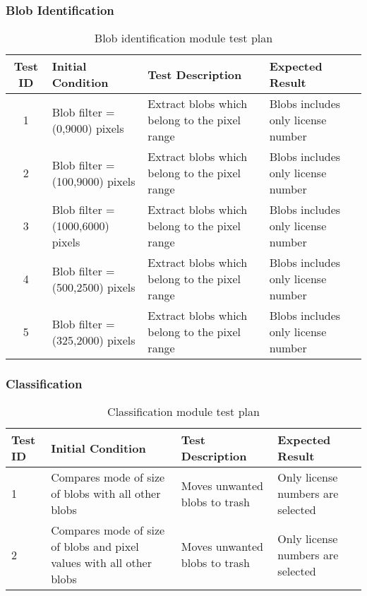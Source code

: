 \documentclass[a4paper,10pt]{iesreport}
\begin{document}
\subsubsection*{Blob Identification}
\begin{table}
\caption{Blob identification module test plan}
\begin{tabular}{c|p{3.2cm}|p{5cm}|p{3.5cm}}
\hline
\textbf{Test ID} & \textbf{Initial Condition} & \textbf{Test Description} & \textbf{Expected Result} \\ [0.3ex]
\hline
1 & Blob filter = (0,9000) pixels & Extract blobs which belong to the pixel range & Blobs includes only license number\\
\hline
2 & Blob filter = (100,9000) pixels & Extract blobs which belong to the pixel range & Blobs includes only license number\\
\hline
3 & Blob filter = (1000,6000) pixels & Extract blobs which belong to the pixel range & Blobs includes only license number\\
\hline
4 & Blob filter = (500,2500) pixels & Extract blobs which belong to the pixel range & Blobs includes only license number\\
\hline
5 & Blob filter = (325,2000) pixels & Extract blobs which belong to the pixel range & Blobs includes only license number\\%
\hline
\end{tabular}
\label{table:nonlin}
\end{table}
\newpage
\subsubsection*{Classification}
\begin{table}
\caption{Classification module test plan}
\begin{tabular}{p{3.2cm}|p{3.2cm}|p{5cm}|p{3.5cm}}
\hline
\textbf{Test ID} & \textbf{Initial Condition} & \textbf{Test Description} & \textbf{Expected Result} \\ [0.3ex]
\hline
1 & Compares mode of size of blobs with all other blobs & Moves unwanted blobs to trash &  Only license numbers are selected
\\ \hline
2 & Compares mode of size of blobs and pixel values with all other blobs & Moves unwanted blobs to trash &  Only license numbers are selected \\
\hline
\end{tabular}
\label{table:nonlin}
\end{table}
\end{document}
